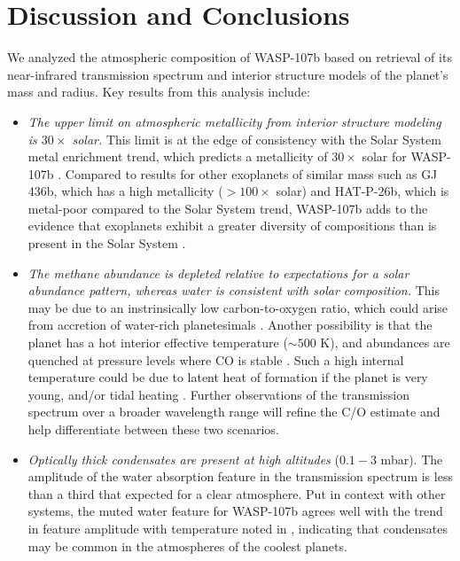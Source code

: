 \documentclass[twocolumn, trackchanges]{aastex61}
\begin{document}
\section{Discussion and Conclusions} \label{sec:discuss}
We analyzed the atmospheric composition of WASP-107b based on retrieval of its near-infrared transmission spectrum and interior structure models of the planet's mass and radius.  Key results from this analysis include:

\begin{itemize}
\item{\emph{The upper limit on atmospheric metallicity from interior structure modeling is $30\times$ solar.} This limit is at the edge of consistency with the Solar System metal enrichment trend, which predicts a metallicity of $30\times$ solar for WASP-107b \citep{kreidberg14b}.  Compared to results for other exoplanets of similar mass such as GJ 436b, which has a high metallicity ($>100\times$ solar) and HAT-P-26b, which is metal-poor compared to the Solar System trend, WASP-107b adds to the evidence that exoplanets exhibit a greater diversity of compositions than is present in the Solar System \citep{morley17, wakeford17}.}
\item{\emph{The methane abundance is  depleted relative to expectations for a solar abundance pattern, whereas water is consistent with solar composition.} This may be due to an instrinsically low carbon-to-oxygen ratio, which could arise from accretion of water-rich planetesimals \citep{mordasini16, espinoza17}.  Another possibility is that the planet has a hot interior effective temperature ($\sim500$ K), and abundances are quenched at pressure levels where CO is stable \citep[as observed in some directly imaged planets;][]{skemer14, zahnle14}. Such a high internal temperature could be due to latent heat of formation if the planet is very young, and/or tidal heating \citep{fortney08, morley17}. Further observations of the transmission spectrum over a broader wavelength range will refine the C/O estimate and help differentiate between these two scenarios.} 
\item{\emph{Optically thick condensates are present at high altitudes} ($0.1 - 3$ mbar). The amplitude of the water absorption feature in the transmission spectrum is less than a third that expected for a clear atmosphere.   Put in context with other systems, the muted water feature for WASP-107b agrees well with the trend in feature amplitude with temperature noted in \cite{crossfield17}, indicating that condensates may be common in the atmospheres of the coolest planets.}
\end{itemize}
\end{document}
